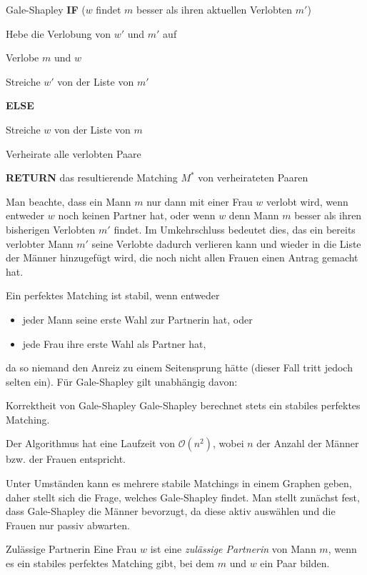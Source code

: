\documentclass{panikzettel}
\newcommand\tab[1][1cm]{\hspace*{#1}}
\begin{document}
{\begin{algo}{Gale-Shapley}
	\tab\tab  \textbf{IF} ($w$ findet $m$ besser als ihren aktuellen Verlobten $m'$)
	
	\tab\tab\tab Hebe die Verlobung von $w'$ und $m'$ auf
	
	\tab\tab\tab Verlobe $m$ und $w$
	
	\tab\tab\tab Streiche $w'$ von der Liste von $m'$
	
	\tab\tab \textbf{ELSE}
	
	\tab\tab\tab Streiche $w$ von der Liste von $m$
	
	Verheirate alle verlobten Paare
	
	\textbf{RETURN} das resultierende Matching $M^*$ von verheirateten Paaren
\end{algo}

Man beachte, dass ein Mann $m$ nur dann mit einer Frau $w$ verlobt wird, wenn entweder $w$ noch keinen Partner hat, oder wenn $w$ denn Mann $m$ besser als ihren bisherigen Verlobten $m'$ findet. Im Umkehrschluss bedeutet dies, das ein bereits verlobter Mann $m'$ seine Verlobte dadurch verlieren kann und wieder in die Liste der Männer hinzugefügt wird, die noch nicht allen Frauen einen Antrag gemacht hat. 

Ein perfektes Matching ist stabil, wenn entweder 
\begin{itemize}
	\item jeder Mann seine erste Wahl zur Partnerin hat, oder
	\item jede Frau ihre erste Wahl als Partner hat,
\end{itemize}
da so niemand den Anreiz zu einem Seitensprung hätte (dieser Fall tritt jedoch selten ein). Für Gale-Shapley gilt unabhängig davon: 

\begin{theo}{Korrektheit von Gale-Shapley}
	Gale-Shapley berechnet stets ein stabiles perfektes Matching. 
	
	Der Algorithmus hat eine Laufzeit von $\mathcal{O}(n^2)$, wobei $n$ der Anzahl der Männer bzw. der Frauen entspricht.
\end{theo}

Unter Umständen kann es mehrere stabile Matchings in einem Graphen geben, daher stellt sich die Frage, welches Gale-Shapley findet. Man stellt zunächst fest, dass Gale-Shapley die Männer bevorzugt, da diese aktiv auswählen und die Frauen nur passiv abwarten. 

\begin{thirdboxl}
	\vspace{-\baselineskip}	
	\begin{defi}{Zulässige Partnerin}
		Eine Frau $w$ ist eine \emph{zulässige Partnerin} von Mann $m$, wenn es ein stabiles perfektes Matching gibt, bei dem $m$ und $w$ ein Paar bilden.
	\end{defi}


\end{thirdboxl}}
\end{document}
